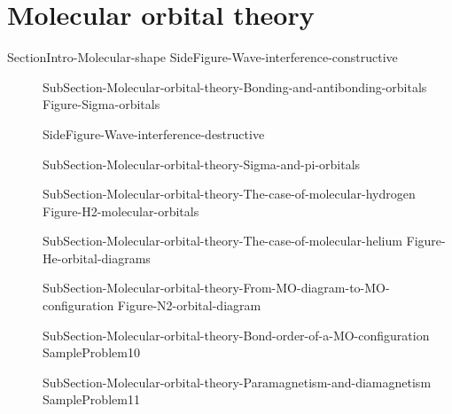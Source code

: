 \documentclass[main.tex]{subfiles}
\begin{document}
\section{Molecular orbital theory}
{SectionIntro-Molecular-shape} 
{SideFigure-Wave-interference-constructive}	
\sloppy\begin{description}
\item[] {SubSection-Molecular-orbital-theory-Bonding-and-antibonding-orbitals}
{Figure-Sigma-orbitals}  \vspace{4cm}
 
 {SideFigure-Wave-interference-destructive}  
\item[] {SubSection-Molecular-orbital-theory-Sigma-and-pi-orbitals}
\vspace{-1cm}{Figure-Pi-orbitals}
\item[] {SubSection-Molecular-orbital-theory-The-case-of-molecular-hydrogen}
{Figure-H2-molecular-orbitals}
\item[] {SubSection-Molecular-orbital-theory-The-case-of-molecular-helium}
{Figure-He-orbital-diagrams}
\item[] {SubSection-Molecular-orbital-theory-From-MO-diagram-to-MO-configuration}
{Figure-N2-orbital-diagram}
\item[] {SubSection-Molecular-orbital-theory-Bond-order-of-a-MO-configuration}
{SampleProblem10}
\item[] {SubSection-Molecular-orbital-theory-Paramagnetism-and-diamagnetism}
{SampleProblem11}
\end{description}




 \checkoddpage\ifoddpage \clearpage\thispagestyle{empty}\mbox{}\clearpage \else  \fi 
\end{document}
